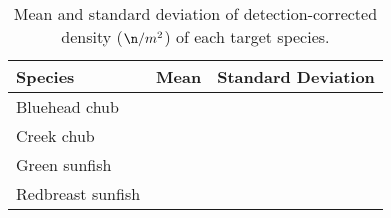 \begin{table}[ht]
\centering
\caption{Mean and standard deviation of detection-corrected density ($\n/m^2$) of each target species.} 
\label{tab:density}
\begin{tabular}{lrr}
  \hline
Species & Mean & Standard Deviation \\ 
  \hline
Bluehead chub &  &  \\ 
  Creek chub &  &  \\ 
  Green sunfish &  &  \\ 
  Redbreast sunfish &  &  \\ 
   \hline
\end{tabular}
\end{table}
